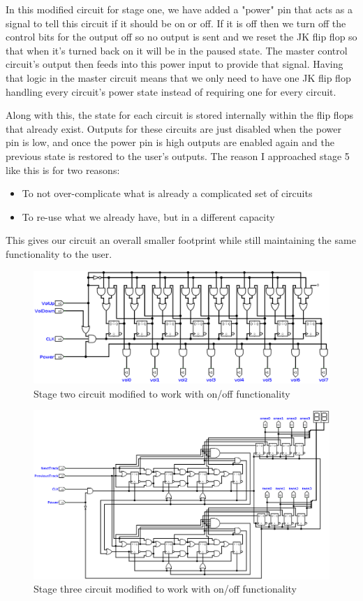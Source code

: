 \documentclass[11pt]{scrartcl}
\begin{document}
\pagebreak

In this modified circuit for stage one, we have added a "power" pin that acts as a signal
to tell this circuit if it should be on or off. If it is off then we turn off the control
bits for the output off so no output is sent and we reset the JK flip flop so that when
it's turned back on it will be in the paused state. The master control circuit's output
then feeds into this power input to provide that signal. Having that logic in the master
circuit means that we only need to have one JK flip flop handling every circuit's power
state instead of requiring one for every circuit.

\bigskip

Along with this, the state for each circuit is stored internally within the flip flops
that already exist. Outputs for these circuits are just disabled when the power pin is
low, and once the power pin is high outputs are enabled again and the previous state is
restored to the user's outputs. The reason I approached stage 5 like this is for two
reasons:
\begin{itemize}
    \item To not over-complicate what is already a complicated set of circuits
    \item To re-use what we already have, but in a different capacity
\end{itemize}
This gives our circuit an overall smaller footprint while still maintaining the same
functionality to the user.
\begin{figure}[h]
    \centering
    \includegraphics[scale=0.35]{images/stagetwonew.png}
    \caption{Stage two circuit modified to work with on/off functionality}
\end{figure}
\begin{figure}[h]
    \centering
    \includegraphics[scale=0.25]{images/stagethreenew.png}
    \caption{Stage three circuit modified to work with on/off functionality}
\end{figure}
\end{document}
